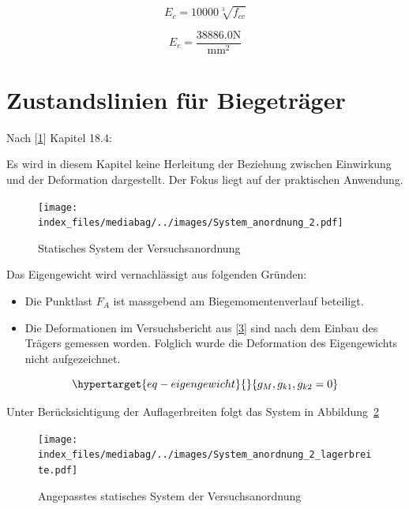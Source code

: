 \documentclass[
  12pt,
  letterpaper,
  egregdoesnotlikesansseriftitles]{scrreprt}
\providecommand{\tightlist}{%
  \setlength{\itemsep}{0pt}\setlength{\parskip}{0pt}}\usepackage{longtable,booktabs,array}
\begin{document}
\begin{equation}E_{c} = 10000 \sqrt[3]{f_{cc}}\end{equation}

\begin{equation}E_{c} = \frac{38886.0 \text{N}}{\text{mm}^{2}}\end{equation}

\hypertarget{zustandslinien-fuxfcr-biegetruxe4ger}{%
\section{Zustandslinien für
Biegeträger}\label{zustandslinien-fuxfcr-biegetruxe4ger}}

Nach {[}\protect\hyperlink{ref-Marti}{1}{]} Kapitel 18.4:

Es wird in diesem Kapitel keine Herleitung der Beziehung zwischen
Einwirkung und der Deformation dargestellt. Der Fokus liegt auf der
praktischen Anwendung.

\begin{figure}[H]

{\centering \texttt{[image: index\_files/mediabag/../images/System\_anordnung\_2.pdf]}

}

\caption{\label{fig-system_2}Statisches System der Versuchsanordnung}

\end{figure}

Das Eigengewicht wird vernachlässigt aus folgenden Gründen:

\begin{itemize}
\tightlist
\item
  Die Punktlast \(F_A\) ist massgebend am Biegemomentenverlauf
  beteiligt.
\item
  Die Deformationen im Versuchsbericht aus
  {[}\protect\hyperlink{ref-Jaeger2006}{3}{]} sind nach dem Einbau des
  Trägers gemessen worden. Folglich wurde die Deformation des
  Eigengewichts nicht aufgezeichnet.
\end{itemize}

\begin{equation}\protect\hypertarget{eq-eigengewicht}{}{
g_M, g_{k1}, g_{k2} = 0
}\label{eq-eigengewicht}\end{equation}

Unter Berücksichtigung der Auflagerbreiten folgt das System in
Abbildung~\ref{fig-system_2_lager}

\begin{figure}[H]

{\centering \texttt{[image: index\_files/mediabag/../images/System\_anordnung\_2\_lagerbreite.pdf]}

}

\caption{\label{fig-system_2_lager}Angepasstes statisches System der
Versuchsanordnung}

\end{figure}
\end{document}
